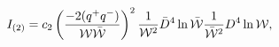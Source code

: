 \begin{equation}\label{complement_2}
I_{(2)}= c_{2}\left({-2(q^{+}q^{-})\over {\cal W}\bar{\cal
W}}\right)^{2} {1\over {\cal W}^2}\bar{D}^4 \ln \bar{\cal W} {1\over \bar{\cal W}^2}
D^4 \ln {\cal W},
\end{equation}

